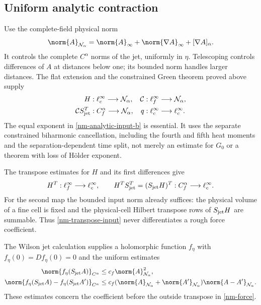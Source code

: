 \subsection{Uniform analytic contraction}
\label{nm-contraction}

Use the complete-field physical norm
\begin{equation}\label{nm-norm}
 \norm{A}_{\mathcal N_\alpha}
 =\norm{A}_\infty+\norm{\nabla A}_\infty+[\nabla A]_\alpha.
\end{equation}
It controls the complete $C^\alpha$ norms of the jet, uniformly in
$\eta$. Telescoping controls differences of $A$ at distances below
one; its bounded norm handles larger distances. The flat extension
and the constrained Green theorem proved above supply
\begin{align}
 H &: \ell^\infty_c\longrightarrow\mathcal N_\alpha,&
 \mathcal C &: \ell^\infty_f\longrightarrow\mathcal N_\alpha,
                                                        \label{nm-analytic-input-a}\\
 \mathcal C S_{\rm jet}^T &: C^\alpha_f\longrightarrow\mathcal N_\alpha,
 &q &: \ell^\infty_c\longrightarrow\ell^\infty_c.
                                                        \label{nm-analytic-input-b}
\end{align}
The equal exponent in \eqref{nm-analytic-input-b} is essential.
It uses the separate constrained biharmonic cancellation, including
the fourth and fifth heat moments and the separation-dependent
time split, not merely an estimate for $G_0$ or a theorem with
loss of H\"older exponent.

The transpose estimates for $H$ and its first differences give
\begin{equation}\label{nm-transpose-input}
 H^T:\ell^\infty_f\longrightarrow\ell^\infty_c,
 \qquad H^TS_{\rm jet}^T=(S_{\rm jet}H)^T:
       C^\alpha_f\longrightarrow\ell^\infty_c.
\end{equation}
For the second map the bounded input norm already suffices:
the physical volume of a fine cell is fixed and the physical-cell
Hilbert transpose rows of $S_{\rm jet}H$ are summable. Thus
\eqref{nm-transpose-input} never differentiates a rough force
coefficient.

The Wilson jet calculation supplies a holomorphic function
$f_\eta$ with $f_\eta(0)=Df_\eta(0)=0$ and the uniform estimates
\begin{align}
 \norm{f_\eta(S_{\rm jet}A)}_{C^\alpha}
 &\le c_f\norm{A}_{\mathcal N_\alpha}^2,                 \label{nm-force-bound}\\
 \norm{f_\eta(S_{\rm jet}A)-f_\eta(S_{\rm jet}A')}_{C^\alpha}
 &\le c_f(\norm{A}_{\mathcal N_\alpha}+
           \norm{A'}_{\mathcal N_\alpha})
                 \norm{A-A'}_{\mathcal N_\alpha}.        \label{nm-force-lipschitz}
\end{align}
These estimates concern the coefficient before the outside
transpose in \eqref{nm-force}.

